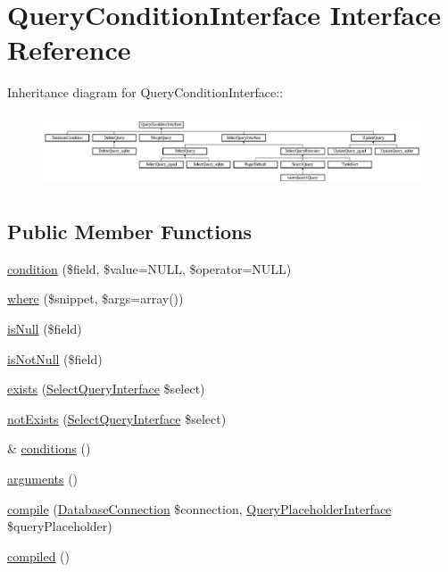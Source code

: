 \hypertarget{interfaceQueryConditionInterface}{
\section{QueryConditionInterface Interface Reference}
\label{interfaceQueryConditionInterface}
}
Inheritance diagram for QueryConditionInterface::\begin{figure}[H]
\begin{center}
\leavevmode
\includegraphics[height=2.20126cm]{interfaceQueryConditionInterface}
\end{center}
\end{figure}
\subsection*{Public Member Functions}
\begin{DoxyCompactItemize}
\item 
\hyperlink{interfaceQueryConditionInterface_aa6d9d96fa17441b5222d1ffddd4c1799}{condition} (\$field, \$value=NULL, \$operator=NULL)
\item 
\hyperlink{interfaceQueryConditionInterface_a42c03c74dd81ef6d77041e67ec12e735}{where} (\$snippet, \$args=array())
\item 
\hyperlink{interfaceQueryConditionInterface_a2978b536a3fe62b21e940366c9cb5923}{isNull} (\$field)
\item 
\hyperlink{interfaceQueryConditionInterface_a8bbb6acc9c72911b165cf6eb1dc31453}{isNotNull} (\$field)
\item 
\hyperlink{interfaceQueryConditionInterface_a27a52b6e84393275ad2c54eaf1bd764a}{exists} (\hyperlink{interfaceSelectQueryInterface}{SelectQueryInterface} \$select)
\item 
\hyperlink{interfaceQueryConditionInterface_a8aae11796846850edbf8caa3a9d4afcd}{notExists} (\hyperlink{interfaceSelectQueryInterface}{SelectQueryInterface} \$select)
\item 
\& \hyperlink{interfaceQueryConditionInterface_a894cc290ed61feb3693b1d459ae86888}{conditions} ()
\item 
\hyperlink{interfaceQueryConditionInterface_ac2349e02d5332412182cf472ba1a1b1e}{arguments} ()
\item 
\hyperlink{interfaceQueryConditionInterface_ad409672ac9ac50787eec52ecdf5a60b1}{compile} (\hyperlink{classDatabaseConnection}{DatabaseConnection} \$connection, \hyperlink{interfaceQueryPlaceholderInterface}{QueryPlaceholderInterface} \$queryPlaceholder)
\item 
\hyperlink{interfaceQueryConditionInterface_a4aac3f4505275edecad9c22351e591cb}{compiled} ()
\end{DoxyCompactItemize}


